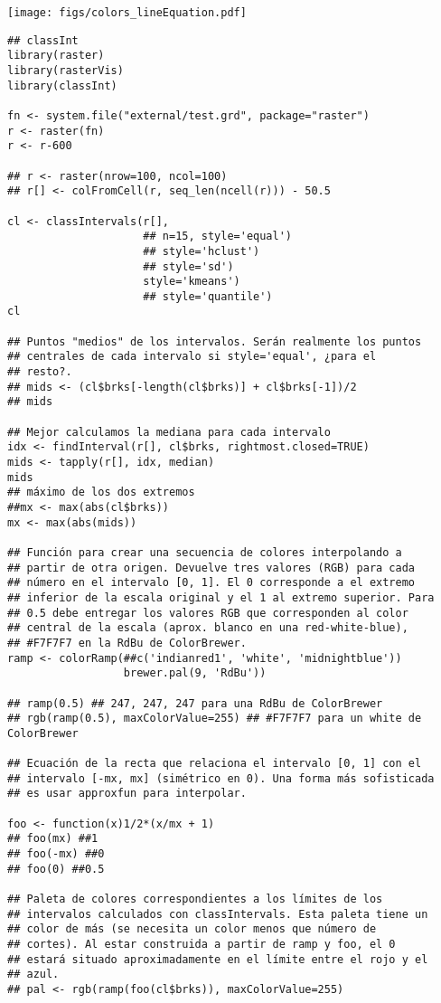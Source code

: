 \texttt{[image: figs/colors\_lineEquation.pdf]}




\lstset{language=R}
\begin{lstlisting}
## classInt
library(raster)
library(rasterVis)
library(classInt)

fn <- system.file("external/test.grd", package="raster")
r <- raster(fn)
r <- r-600

## r <- raster(nrow=100, ncol=100)
## r[] <- colFromCell(r, seq_len(ncell(r))) - 50.5

cl <- classIntervals(r[],
                     ## n=15, style='equal')
                     ## style='hclust')
                     ## style='sd')
                     style='kmeans')
                     ## style='quantile')
cl

## Puntos "medios" de los intervalos. Serán realmente los puntos
## centrales de cada intervalo si style='equal', ¿para el
## resto?. 
## mids <- (cl$brks[-length(cl$brks)] + cl$brks[-1])/2
## mids

## Mejor calculamos la mediana para cada intervalo
idx <- findInterval(r[], cl$brks, rightmost.closed=TRUE)
mids <- tapply(r[], idx, median)
mids
## máximo de los dos extremos
##mx <- max(abs(cl$brks))
mx <- max(abs(mids))

## Función para crear una secuencia de colores interpolando a
## partir de otra origen. Devuelve tres valores (RGB) para cada
## número en el intervalo [0, 1]. El 0 corresponde a el extremo
## inferior de la escala original y el 1 al extremo superior. Para
## 0.5 debe entregar los valores RGB que corresponden al color
## central de la escala (aprox. blanco en una red-white-blue),
## #F7F7F7 en la RdBu de ColorBrewer.
ramp <- colorRamp(##c('indianred1', 'white', 'midnightblue'))
                  brewer.pal(9, 'RdBu'))

## ramp(0.5) ## 247, 247, 247 para una RdBu de ColorBrewer
## rgb(ramp(0.5), maxColorValue=255) ## #F7F7F7 para un white de ColorBrewer

## Ecuación de la recta que relaciona el intervalo [0, 1] con el
## intervalo [-mx, mx] (simétrico en 0). Una forma más sofisticada
## es usar approxfun para interpolar.

foo <- function(x)1/2*(x/mx + 1)
## foo(mx) ##1
## foo(-mx) ##0
## foo(0) ##0.5

## Paleta de colores correspondientes a los límites de los
## intervalos calculados con classIntervals. Esta paleta tiene un
## color de más (se necesita un color menos que número de
## cortes). Al estar construida a partir de ramp y foo, el 0
## estará situado aproximadamente en el límite entre el rojo y el
## azul.
## pal <- rgb(ramp(foo(cl$brks)), maxColorValue=255)


\end{lstlisting}
